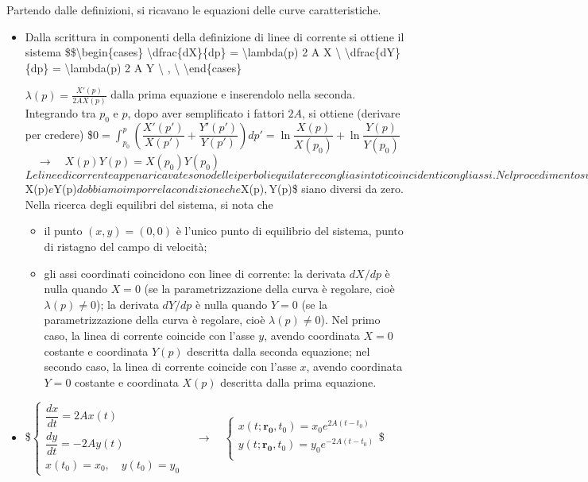 \documentclass[letterpaper,10pt,italian]{jupyterBook}
\begin{document}
\sphinxAtStartPar
Partendo dalle definizioni, si ricavano le equazioni delle curve
caratteristiche.
\begin{itemize}
\item {} 
\sphinxAtStartPar
{} Dalla scrittura in componenti della
definizione di linee di corrente si ottiene il sistema
\$\$\textbackslash{}begin\{cases\}
\textbackslash{}dfrac\{dX\}\{dp\} = \textbackslash{}lambda(p) 2 A X \textbackslash{}
\textbackslash{}dfrac\{dY\}\{dp\} = \sphinxhyphen{} \textbackslash{}lambda(p) 2 A Y \textbackslash{} , \textbackslash{}
\textbackslash{}end\{cases\}

\sphinxAtStartPar
\(\lambda(p) = \frac{X'(p)}{2 A X(p)}\) dalla prima equazione e
inserendolo nella seconda. Integrando tra \(p_0\) e \(p\), dopo aver
semplificato i fattori \(2 A\), si ottiene (derivare per credere)
\$\(0 = \int_{p_0}^{p} \left( \dfrac{X'(p')}{X(p')} + \dfrac{Y'(p')}{Y(p')} \right) dp' =
 \ln{\dfrac{X(p)}{X(p_0)}} + \ln{\dfrac{Y(p)}{Y(p_0)}}\)\(
\)\(\quad \rightarrow \quad
 X(p)Y(p) = X(p_0)Y(p_0)\)\( Le linee di corrente appena ricavate sono
delle iperboli equilatere con gli asintoti coincidenti con gli assi.
Nel procedimento svolto, per poter dividere per \)X(p)\( e \)Y(p)\(
dobbiamo imporre la condizione che \)X(p)\(, \)Y(p)\$ siano diversi da
zero. Nella ricerca degli equilibri del sistema, si nota che
\begin{itemize}
\item {} 
\sphinxAtStartPar
il punto \((x,y) = (0,0)\) è l’unico punto di equilibrio del
sistema, punto di ristagno del campo di velocità;

\item {} 
\sphinxAtStartPar
gli assi coordinati coincidono con linee di corrente: la
derivata \(dX/dp\) è nulla quando \(X=0\) (se la parametrizzazione
della curva è regolare, cioè \(\lambda(p) \ne 0\)); la derivata
\(dY/dp\) è nulla quando \(Y=0\) (se la parametrizzazione della
curva è regolare, cioè \(\lambda(p) \ne 0\)). Nel primo caso, la
linea di corrente coincide con l’asse \(y\), avendo coordinata
\(X=0\) costante e coordinata \(Y(p)\) descritta dalla seconda
equazione; nel secondo caso, la linea di corrente coincide con
l’asse \(x\), avendo coordinata \(Y=0\) costante e coordinata \(X(p)\)
descritta dalla prima equazione.

\end{itemize}

\item {} 
\sphinxAtStartPar
{} \$\(\begin{cases}
  \dfrac{dx}{dt} = 2 A x(t) \\
  \dfrac{dy}{dt} = -  2 A y(t) \\
  x(t_0) = x_0 , \quad y(t_0) = y_0
 \end{cases}
 \quad\rightarrow\quad
 \begin{cases}
  x(t;\bm{r_0},t_0) = x_0 e^{2A(t-t_0)} \\
  y(t;\bm{r_0},t_0) = y_0 e^{-2A(t-t_0)} \\
 \end{cases}\)\$


\end{itemize}
\end{document}
